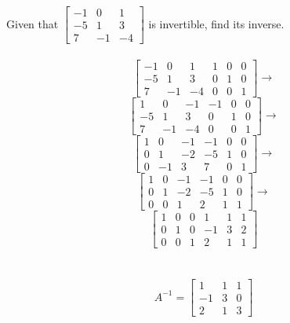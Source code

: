 \documentclass[12pt]{article}
\begin{document}
\begin{example} Given that $\begin{bmatrix} -1 & 0 & 1 \\ -5 & 1 & 3 \\ 7 & -1 &-4 \end{bmatrix} $ is invertible, find its inverse. \\~\\ 
$$ \begin{bmatrix}  -1 & 0 & 1 & 1 & 0 & 0 \\ -5 & 1 & 3 & 0 & 1 & 0 \\ 7 & -1 & -4 & 0 & 0 & 1  \end{bmatrix} \rightarrow $$
$$  \begin{bmatrix}  1 & 0 & -1 & -1 & 0 & 0 \\ -5 & 1 & 3 & 0 & 1 & 0 \\ 7 & -1 & -4 & 0 & 0 & 1  \end{bmatrix} \rightarrow $$
$$ \begin{bmatrix}  1 & 0 & -1 & -1 & 0 & 0 \\ 0 & 1 & -2 & -5 & 1 & 0 \\ 0 & -1 & 3 & 7 & 0 & 1  \end{bmatrix} \rightarrow  $$ 
$$ \begin{bmatrix}  1 & 0 & -1 & -1 & 0 & 0 \\ 0 & 1 & -2 & -5 & 1 & 0 \\ 0 & 0 & 1 & 2 & 1 & 1  \end{bmatrix} \rightarrow $$
$$ \begin{bmatrix}  1 & 0 & 0 & 1 & 1 & 1 \\ 0 & 1 & 0 & -1 & 3 & 2 \\ 0 & 0 & 1 & 2 & 1 & 1  \end{bmatrix} $$ \\~\\ 
$$  A^{-1} = \begin{bmatrix} 1 & 1 & 1 \\ -1 & 3 & 0 \\ 2 & 1 &3 \end{bmatrix} $$ \end{example}
\end{document}
